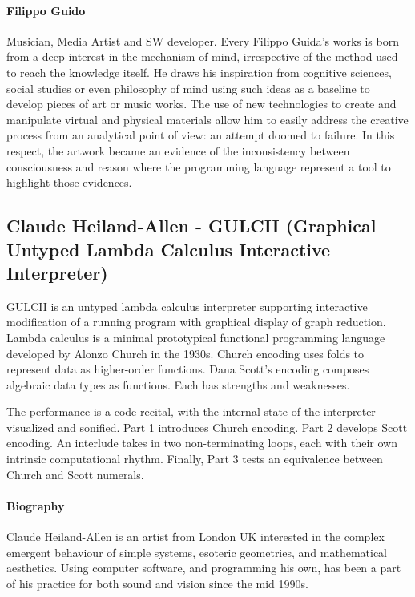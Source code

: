 \documentclass[sigplan,10pt,review]{acmart}\settopmatter{printfolios=true}
\begin{document}
\paragraph{Filippo Guido} Musician, Media Artist and SW developer. Every Filippo Guida’s works
is born from a deep interest in the mechanism of mind, irrespective of
the method used to reach the knowledge itself.  He draws his
inspiration from cognitive sciences, social studies or even philosophy
of mind using such ideas as a baseline to develop pieces of art or
music works.  The use of new technologies to create and manipulate
virtual and physical materials allow him to easily address the
creative process from an analytical point of view: an attempt doomed
to failure.  In this respect, the artwork became an evidence of the
inconsistency between consciousness and reason where the programming
language represent a tool to highlight those evidences.


\subsection{Claude Heiland-Allen - GULCII (Graphical Untyped Lambda Calculus Interactive Interpreter)}

GULCII is an untyped lambda calculus interpreter supporting interactive
modification of a running program with graphical display of graph reduction.
Lambda calculus is a minimal prototypical functional programming language
developed by Alonzo Church in the 1930s.  Church encoding uses folds to
represent data as higher-order functions.  Dana Scott's encoding composes
algebraic data types as functions.  Each has strengths and weaknesses.

The performance is a code recital, with the internal state of the interpreter
visualized and sonified.  Part 1 introduces Church encoding.  Part 2 develops
Scott encoding.  An interlude takes in two non-terminating loops, each with
their own intrinsic computational rhythm.  Finally, Part 3 tests an equivalence
between Church and Scott numerals.

\paragraph{Biography}

Claude Heiland-Allen is an artist from London UK interested in the complex
emergent behaviour of simple systems, esoteric geometries, and mathematical
aesthetics.  Using computer software, and programming his own, has been a
part of his practice for both sound and vision since the mid 1990s.
\end{document}
